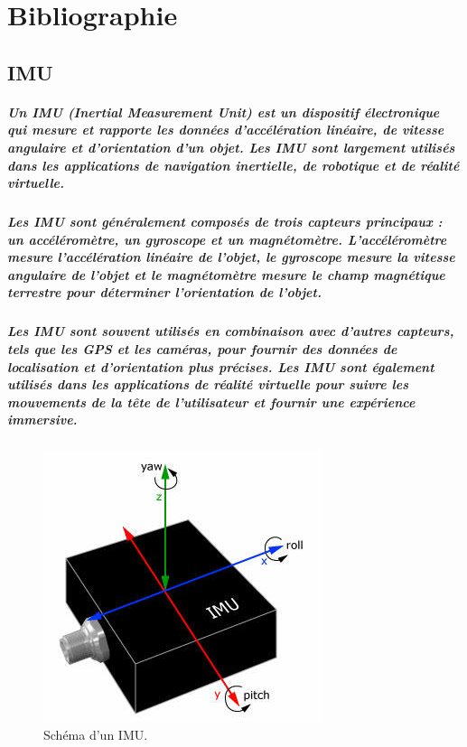 \chapter{Bibliographie}
\label{cp:bibliographie}

\section{IMU}

\paragraph{Un IMU (Inertial Measurement Unit) est un dispositif électronique qui mesure et rapporte les données d'accélération linéaire, de vitesse angulaire et d'orientation d'un objet. Les IMU sont largement utilisés dans les applications de navigation inertielle, de robotique et de réalité virtuelle.}

\paragraph{Les IMU sont généralement composés de trois capteurs principaux : un accéléromètre, un gyroscope et un magnétomètre. L'accéléromètre mesure l'accélération linéaire de l'objet, le gyroscope mesure la vitesse angulaire de l'objet et le magnétomètre mesure le champ magnétique terrestre pour déterminer l'orientation de l'objet.}

\paragraph{Les IMU sont souvent utilisés en combinaison avec d'autres capteurs, tels que les GPS et les caméras, pour fournir des données de localisation et d'orientation plus précises. Les IMU sont également utilisés dans les applications de réalité virtuelle pour suivre les mouvements de la tête de l'utilisateur et fournir une expérience immersive.}

\begin{figure}[!htpb]
    \centering
    \includegraphics[width=0.5\linewidth]{Figures/imu.jpg}
    \caption[Schéma d'un IMU]{Schéma d'un IMU.}
    \label{fig:imu}
\end{figure}

